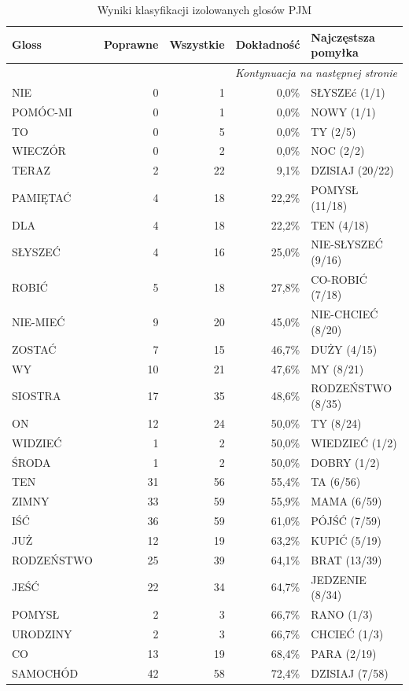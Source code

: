\documentclass[12pt]{article}
\begin{document}
\newpage
\begin{longtable}{lrrrl}
\caption{Wyniki klasyfikacji izolowanych glosów PJM}

\label{tab:islr_results}\\
\toprule
Gloss & Poprawne & Wszystkie& Dokładność& Najczęstsza pomyłka \\
\midrule
\endhead
\midrule \multicolumn{5}{r}{\textit{Kontynuacja na następnej stronie}}\\
\endfoot
\bottomrule
\endlastfoot
NIE & 0 & 1 & 0,0\% & SŁYSZEć (1/1) \\
POMÓC-MI & 0 & 1 & 0,0\% & NOWY (1/1) \\
TO & 0 & 5 & 0,0\% & TY (2/5) \\
WIECZÓR & 0 & 2 & 0,0\% & NOC (2/2) \\
TERAZ & 2 & 22 & 9,1\% & DZISIAJ (20/22) \\
PAMIĘTAĆ & 4 & 18 & 22,2\% & POMYSŁ (11/18) \\
DLA & 4 & 18 & 22,2\% & TEN (4/18) \\
SŁYSZEĆ & 4 & 16 & 25,0\% & NIE-SŁYSZEĆ (9/16) \\
ROBIĆ & 5 & 18 & 27,8\% & CO-ROBIĆ (7/18) \\
NIE-MIEĆ & 9 & 20 & 45,0\% & NIE-CHCIEĆ (8/20) \\
ZOSTAĆ & 7 & 15 & 46,7\% & DUŻY (4/15) \\
WY & 10 & 21 & 47,6\% & MY (8/21) \\
SIOSTRA & 17 & 35 & 48,6\% & RODZEŃSTWO (8/35) \\
ON & 12 & 24 & 50,0\% & TY (8/24) \\
WIDZIEĆ & 1 & 2 & 50,0\% & WIEDZIEĆ (1/2) \\
ŚRODA & 1 & 2 & 50,0\% & DOBRY (1/2) \\
TEN & 31 & 56 & 55,4\% & TA (6/56) \\
ZIMNY & 33 & 59 & 55,9\% & MAMA (6/59) \\
IŚĆ & 36 & 59 & 61,0\% & PÓJŚĆ (7/59) \\
JUŻ & 12 & 19 & 63,2\% & KUPIĆ (5/19) \\
RODZEŃSTWO & 25 & 39 & 64,1\% & BRAT (13/39) \\
JEŚĆ & 22 & 34 & 64,7\% & JEDZENIE (8/34) \\
POMYSŁ & 2 & 3 & 66,7\% & RANO (1/3) \\
URODZINY & 2 & 3 & 66,7\% & CHCIEĆ (1/3) \\
CO & 13 & 19 & 68,4\% & PARA (2/19) \\
SAMOCHÓD & 42 & 58 & 72,4\% & DZISIAJ (7/58) \\

\end{longtable}
\end{document}
